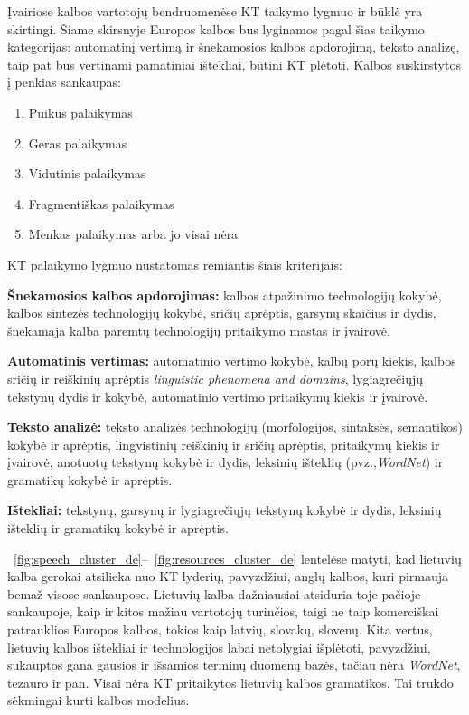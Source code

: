 \begin{multicols}{2}
 Įvairiose kalbos vartotojų bendruomenėse KT taikymo lygmuo ir būklė yra skirtingi. Šiame skirsnyje Europos kalbos bus lyginamos pagal šias taikymo kategorijas: automatinį vertimą ir šnekamosios kalbos apdorojimą, teksto analizę, taip pat bus vertinami pamatiniai ištekliai, būtini KT plėtoti. Kalbos suskirstytos į penkias sankaupas:

\begin{enumerate}
\item Puikus palaikymas
\item Geras palaikymas
\item Vidutinis palaikymas
\item Fragmentiškas palaikymas
\item Menkas palaikymas arba jo visai nėra
\end{enumerate}

KT palaikymo lygmuo nustatomas remiantis šiais kriterijais:

\textbf{Šnekamosios kalbos apdorojimas:} kalbos atpažinimo technologijų kokybė, kalbos sintezės technologijų kokybė, sričių aprėptis, garsynų skaičius ir dydis, šnekamąja kalba paremtų technologijų pritaikymo mastas ir įvairovė.

\textbf{Automatinis vertimas:} automatinio vertimo kokybė, kalbų porų kiekis, kalbos sričių ir reiškinių aprėptis \textit{linguistic phenomena and domains}, lygiagrečiųjų tekstynų dydis ir kokybė, automatinio vertimo pritaikymų kiekis ir įvairovė.

\textbf{Teksto analizė:} teksto analizės technologijų (morfologijos, sintaksės, semantikos) kokybė ir aprėptis, lingvistinių reiškinių ir sričių aprėptis, pritaikymų kiekis ir įvairovė, anotuotų tekstynų kokybė ir dydis, leksinių išteklių (pvz.,\textit{WordNet}) ir gramatikų kokybė ir aprėptis.

\textbf{Ištekliai:} tekstynų, garsynų ir lygiagrečiųjų tekstynų kokybė ir dydis, leksinių išteklių ir gramatikų kokybė ir aprėptis.

~\ref{fig:speech_cluster_de}–~\ref{fig:resources_cluster_de} lentelėse matyti, kad lietuvių kalba gerokai atsilieka nuo KT lyderių, pavyzdžiui, anglų kalbos, kuri pirmauja bemaž visose sankaupose. Lietuvių kalba dažniausiai atsiduria toje pačioje sankaupoje, kaip ir kitos mažiau vartotojų turinčios, taigi ne taip komerciškai patrauklios Europos kalbos, tokios kaip latvių, slovakų, slovėnų. Kita vertus, lietuvių kalbos ištekliai ir technologijos labai netolygiai išplėtoti, pavyzdžiui, sukauptos gana gausios ir išsamios terminų duomenų bazės, tačiau nėra \textit{WordNet}, tezauro ir pan. Visai nėra KT pritaikytos lietuvių kalbos gramatikos. Tai trukdo sėkmingai kurti kalbos modelius.


\end{multicols}
